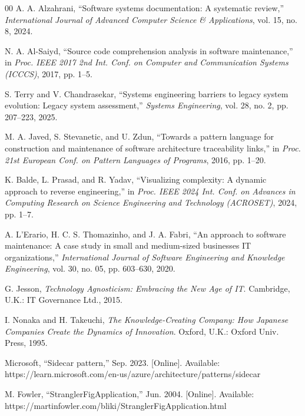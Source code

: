\documentclass{ieeeaccess}
\begin{document}
\begin{thebibliography}{00}
 A. A. Alzahrani, ``Software systems documentation: A systematic review,'' \emph{International Journal of Advanced Computer Science \& Applications}, vol. 15, no. 8, 2024.

 N. A. Al-Saiyd, ``Source code comprehension analysis in software maintenance,'' in \emph{Proc. IEEE 2017 2nd Int. Conf. on Computer and Communication Systems (ICCCS)}, 2017, pp. 1--5.

 S. Terry and V. Chandrasekar, ``Systems engineering barriers to legacy system evolution: Legacy system assessment,'' \emph{Systems Engineering}, vol. 28, no. 2, pp. 207--223, 2025.

 M. A. Javed, S. Stevanetic, and U. Zdun, ``Towards a pattern language for construction and maintenance of software architecture traceability links,'' in \emph{Proc. 21st European Conf. on Pattern Languages of Programs}, 2016, pp. 1--20.

 K. Balde, L. Prasad, and R. Yadav, ``Visualizing complexity: A dynamic approach to reverse engineering,'' in \emph{Proc. IEEE 2024 Int. Conf. on Advances in Computing Research on Science Engineering and Technology (ACROSET)}, 2024, pp. 1--7.

 A. L’Erario, H. C. S. Thomazinho, and J. A. Fabri, ``An approach to software maintenance: A case study in small and medium-sized businesses IT organizations,'' \emph{International Journal of Software Engineering and Knowledge Engineering}, vol. 30, no. 05, pp. 603--630, 2020.

 G. Jesson, \emph{Technology Agnosticism: Embracing the New Age of IT}. Cambridge, U.K.: IT Governance Ltd., 2015.

 I. Nonaka and H. Takeuchi, \emph{The Knowledge-Creating Company: How Japanese Companies Create the Dynamics of Innovation}. Oxford, U.K.: Oxford Univ. Press, 1995.

 Microsoft, ``Sidecar pattern,'' Sep. 2023. [Online]. Available: https://learn.microsoft.com/en-us/azure/architecture/patterns/sidecar

 M. Fowler, ``StranglerFigApplication,'' Jun. 2004. [Online]. Available: https://martinfowler.com/bliki/StranglerFigApplication.html

\end{thebibliography}
\end{document}
